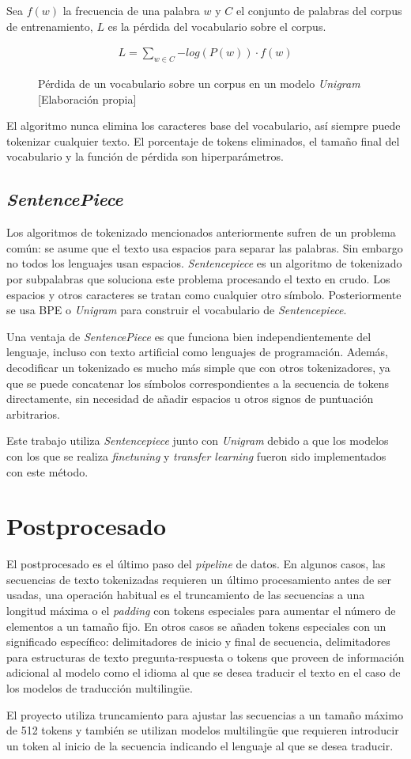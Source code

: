 Sea $f(w)$ la frecuencia de una palabra $w$ y $C$ el conjunto de palabras del corpus de entrenamiento, $L$ es la pérdida del vocabulario sobre el corpus.
\begin{figure}[H]
    \begin{gather*}
        L = \sum_{w\in{C}}{-log(P(w))\cdot{f(w)}}
    \end{gather*}
    \caption{Pérdida de un vocabulario sobre un corpus en un modelo \textit{Unigram} [Elaboración propia]}
\end{figure}
El algoritmo nunca elimina los caracteres base del vocabulario, así siempre puede tokenizar cualquier texto. El porcentaje de tokens eliminados, el tamaño final del vocabulario y la función de pérdida son hiperparámetros.

\subsection{\textit{SentencePiece}}\label{sentencepiece}
Los algoritmos de tokenizado mencionados anteriormente sufren de un problema común: se asume que el texto usa espacios para separar las palabras. Sin embargo no todos los lenguajes usan espacios. \textit{Sentencepiece} \cite{Kudo2018Aug} es un algoritmo de tokenizado por subpalabras que soluciona este problema procesando el texto en crudo. Los espacios y otros caracteres se tratan como cualquier otro símbolo. Posteriormente se usa BPE o \textit{Unigram} para construir el vocabulario de \textit{Sentencepiece}.

Una ventaja de \textit{SentencePiece} es que funciona bien independientemente del lenguaje, incluso con texto artificial como lenguajes de programación. Además, decodificar un tokenizado es mucho más simple que con otros tokenizadores, ya que se puede concatenar los símbolos correspondientes a la secuencia de tokens directamente, sin necesidad de añadir espacios u otros signos de puntuación arbitrarios.

Este trabajo utiliza \textit{Sentencepiece} junto con \textit{Unigram} debido a que los modelos con los que se realiza \textit{finetuning} y \textit{transfer learning} fueron sido implementados con este método.

\section{Postprocesado}
El postprocesado es el último paso del \textit{pipeline} de datos. En algunos casos, las secuencias de texto tokenizadas requieren un último procesamiento antes de ser usadas, una operación habitual es el truncamiento de las secuencias a una longitud máxima o el \textit{padding} con tokens especiales para aumentar el número de elementos a un tamaño fijo. En otros casos se añaden tokens especiales con un significado específico: delimitadores de inicio y final de secuencia, delimitadores para estructuras de texto pregunta-respuesta o tokens que proveen de información adicional al modelo como el idioma al que se desea traducir el texto en el caso de los modelos de traducción multiling{\"u}e.

El proyecto utiliza truncamiento para ajustar las secuencias a un tamaño máximo de 512 tokens y también se utilizan modelos multiling{\"u}e que requieren introducir un token al inicio de la secuencia indicando el lenguaje al que se desea traducir.